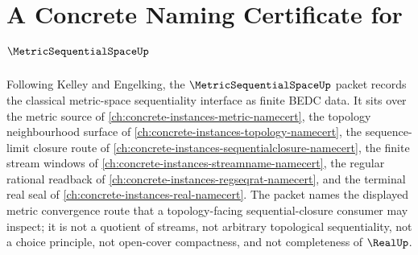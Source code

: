 \chapter{A Concrete Naming Certificate for $\MetricSequentialSpaceUp$}
\label{ch:concrete-instances-metric-sequential-space-namecert}

Following Kelley and Engelking, the $\MetricSequentialSpaceUp$ packet records the classical metric-space sequentiality interface as finite BEDC data. It sits over the metric source of \autoref{ch:concrete-instances-metric-namecert}, the topology neighbourhood surface of \autoref{ch:concrete-instances-topology-namecert}, the sequence-limit closure route of \autoref{ch:concrete-instances-sequentialclosure-namecert}, the finite stream windows of \autoref{ch:concrete-instances-streamname-namecert}, the regular rational readback of \autoref{ch:concrete-instances-regseqrat-namecert}, and the terminal real seal of \autoref{ch:concrete-instances-real-namecert}. The packet names the displayed metric convergence route that a topology-facing sequential-closure consumer may inspect; it is not a quotient of streams, not arbitrary topological sequentiality, not a choice principle, not open-cover compactness, and not completeness of $\RealUp$.

